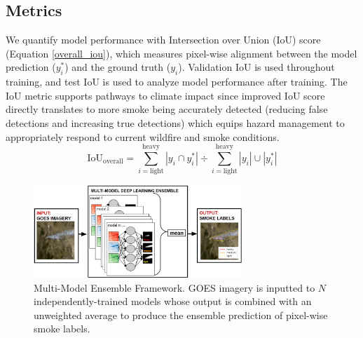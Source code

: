 \documentclass{article}
\begin{document}
\subsection{Metrics} We quantify model performance with Intersection over Union (IoU) score (Equation \ref{overall_iou}), which measures pixel-wise alignment between the model prediction ($y^*_{i}$) and the ground truth ($y_{i}$). Validation IoU is used throughout training, and test IoU is used to analyze model performance after training. The IoU metric supports pathways to climate impact since improved IoU score directly translates to more smoke being accurately detected (reducing false detections and increasing true detections) which equips hazard management to appropriately respond to current wildfire and smoke conditions.
\begin{equation} \label{overall_iou}
    \text{IoU}_{\text{overall}} = {\sum\limits_{i=\text{light}}^{\text{heavy}}|y_{i}\cap y^*_{i}|} \div {\sum\limits_{i=\text{light}}^{\text{heavy}}|y_{i}|\cup|y^*_{i}|}
\end{equation}

\begin{figure}
    \centering
    \includegraphics[width=0.7\textwidth]{ensemble_framework.png}
    \caption{\RaggedRight Multi-Model Ensemble Framework. GOES imagery is inputted to $N$ independently-trained models whose output is combined with an unweighted average to produce the ensemble prediction of pixel-wise smoke labels.}
    \label{fig:ensemble_framework}
\end{figure}
\end{document}
